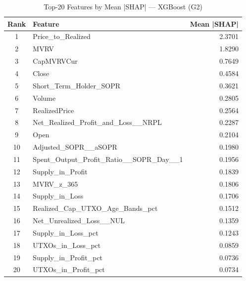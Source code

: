 \begin{table}[htbp]
\centering
\caption{Top-20 Features by Mean |SHAP| — XGBoost (G2)}
\label{tab:fi_XGBoost_G2}
\begin{tabular}{clr}
\toprule
Rank & Feature & Mean |SHAP| \\
\midrule
1 & Price\_to\_Realized & 2.3701 \\
2 & MVRV & 1.8290 \\
3 & CapMVRVCur & 0.7649 \\
4 & Close & 0.4584 \\
5 & Short\_Term\_Holder\_SOPR & 0.3621 \\
6 & Volume & 0.2805 \\
7 & RealizedPrice & 0.2564 \\
8 & Net\_Realized\_Profit\_and\_Loss\_\_NRPL & 0.2287 \\
9 & Open & 0.2104 \\
10 & Adjusted\_SOPR\_\_aSOPR & 0.1980 \\
11 & Spent\_Output\_Profit\_Ratio\_\_SOPR\_Day\_\_1 & 0.1956 \\
12 & Supply\_in\_Profit & 0.1839 \\
13 & MVRV\_z\_365 & 0.1806 \\
14 & Supply\_in\_Loss & 0.1706 \\
15 & Realized\_Cap\_UTXO\_Age\_Bands\_pct & 0.1512 \\
16 & Net\_Unrealized\_Loss\_\_NUL & 0.1359 \\
17 & Supply\_in\_Loss\_pct & 0.1243 \\
18 & UTXOs\_in\_Loss\_pct & 0.0859 \\
19 & Supply\_in\_Profit\_pct & 0.0736 \\
20 & UTXOs\_in\_Profit\_pct & 0.0734 \\
\bottomrule
\end{tabular}
\end{table}